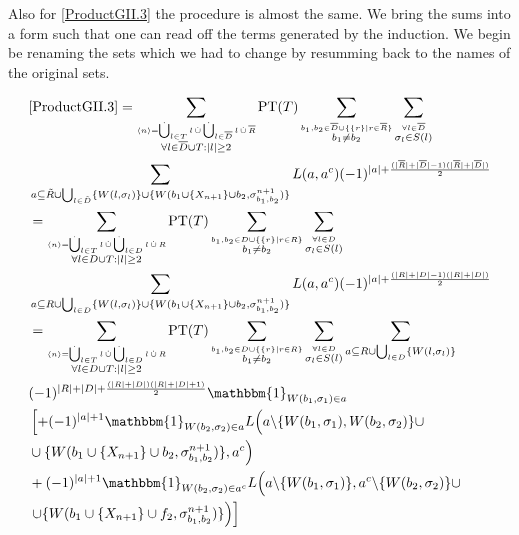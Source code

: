 \documentclass[b5paper,draft,openbib,12pt]{memoir}
\newcommand{\id}{\mathbbm{1}}
\DeclareMathOperator{\dotCup}{\mathop{\dot{\bigcup}}}
\DeclareMathOperator{\dotcup}{\mathop{\dot{\cup}}}
\begin{document}
Also for \eqref{ProductGII.3} the procedure is almost the same. We bring the sums into a form such that one can read off the
terms generated by the induction. We begin be renaming the sets which we had to change by resumming back to the names 
of the original sets. 


\begin{align}\notag
&\eqref{ProductGII.3}=
\sum_{\stackrel{\langle n \rangle = \dotCup_{l\in T}l \dotcup \dotCup_{l\in \overline{D}}l \dotcup \overline{R}}{\forall l \in \overline{D}\cup T: |l|\ge 2}} 
\text{PT}(T) 
\sum_{\stackrel{b_1,b_2\in \overline{D} \cup \{\{r\}\mid r \in \overline{R}\}}{b_1 \neq b_2}} 
\sum_{\stackrel{\forall l \in \overline{D} }{\sigma_l \in S(l)}}\\\notag
&\sum_{a \subseteq \tilde{R}\cup \bigcup_{l \in \tilde{D}}\{W(l,\sigma_l)\} \cup \{W(b_1\cup \{X_{n+1}\}\cup b_2,\sigma^{n+1}_{b_1,b_2})\}} L(a,a^c) (-1)^{|a|+ \frac{(|\overline{R}|+|\overline{D}|-1)(|\overline{R}|+|\overline{D}|)}{2}}\\\notag
&=\sum_{\stackrel{\langle n \rangle = \dotCup_{l\in T}l \dotcup \dotCup_{l\in D}l \dotcup R}{\forall l \in D\cup T: |l|\ge 2}} 
\text{PT}(T) 
\sum_{\stackrel{b_1,b_2\in D \cup \{\{r\}\mid r \in R\}}{b_1 \neq b_2}} 
\sum_{\stackrel{\forall l \in D }{\sigma_l \in S(l)}}\\\notag
&\sum_{a \subseteq R\cup \bigcup_{l \in D}\{W(l,\sigma_l)\} \cup \{W(b_1\cup \{X_{n+1}\}\cup b_2,\sigma^{n+1}_{b_1,b_2})\}} L(a,a^c) (-1)^{|a|+ \frac{(| R|+|D|-1)(|R|+|D|)}{2}}\\\notag
&=\sum_{\stackrel{\langle n \rangle = \dotCup_{l\in T}l \dotcup \dotCup_{l\in D}l \dotcup R}{\forall l \in D\cup T: |l|\ge 2}} 
\text{PT}(T) 
\sum_{\stackrel{b_1,b_2\in D \cup \{\{r\}\mid r \in R\}}{b_1 \neq b_2}} 
\sum_{\stackrel{\forall l \in D }{\sigma_l \in S(l)}} \sum_{a \subseteq R\cup \bigcup_{l \in D}\{W(l,\sigma_l)\}} \\\notag
&(-1)^{|R|+|D|+ \frac{(|R|+|D|)(|R|+|D|+1)}{2}} \id_{W(b_1,\sigma_1)\in a}\\\notag
&\left[+(-1)^{|a|+1}\id_{W(b_2,\sigma_2)\in a} L\Big(a\backslash\{W(b_1,\sigma_1),W(b_2,\sigma_2)\}\cup\right.\\\notag
&\cup \{W(b_1\cup \{X_{n+1}\}\cup b_2,\sigma^{n+1}_{b_1,b_2})\} ,a^c\Big) \\\notag
&+(-1)^{|a|+1}\id_{W(b_2,\sigma_2)\in a^c}L\Big(a\backslash\{W(b_1,\sigma_1)\} ,a^c \backslash\{W(b_2,\sigma_2)\}\cup\\\notag
&\left. \cup \{W(b_1\cup \{X_{n+1}\}\cup f_2,\sigma^{n+1}_{b_1,b_2})\}\Big) \right]\\\notag

\end{align}
\end{document}
